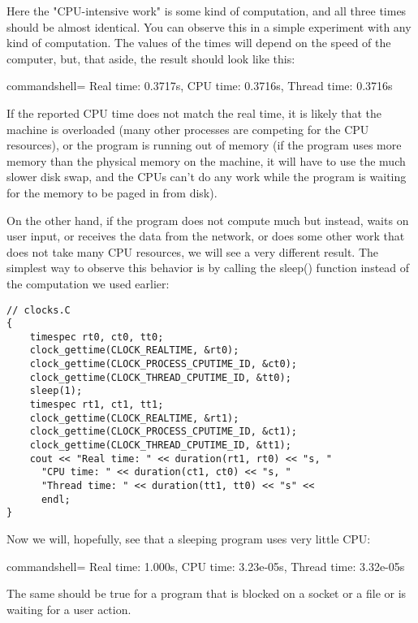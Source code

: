 Here the "CPU-intensive work" is some kind of computation, and all three times should be almost identical. You can observe this in a simple experiment with any kind of computation. The values of the times will depend on the speed of the computer, but, that aside, the result should look like this:

\begin{tcblisting}{commandshell={}}
Real time: 0.3717s, CPU time: 0.3716s, Thread time: 0.3716s
\end{tcblisting}

If the reported CPU time does not match the real time, it is likely that the machine is overloaded (many other processes are competing for the CPU resources), or the program is running out of memory (if the program uses more memory than the physical memory on the machine, it will have to use the much slower disk swap, and the CPUs can't do any work while the program is waiting for the memory to be paged in from disk).

On the other hand, if the program does not compute much but instead, waits on user input, or receives the data from the network, or does some other work that does not take many CPU resources, we will see a very different result. The simplest way to observe this behavior is by calling the sleep() function instead of the computation we used earlier:

\begin{lstlisting}[style=styleCXX]
// clocks.C
{
	timespec rt0, ct0, tt0;
	clock_gettime(CLOCK_REALTIME, &rt0);
	clock_gettime(CLOCK_PROCESS_CPUTIME_ID, &ct0);
	clock_gettime(CLOCK_THREAD_CPUTIME_ID, &tt0);
	sleep(1);
	timespec rt1, ct1, tt1;
	clock_gettime(CLOCK_REALTIME, &rt1);
	clock_gettime(CLOCK_PROCESS_CPUTIME_ID, &ct1);
	clock_gettime(CLOCK_THREAD_CPUTIME_ID, &tt1);
	cout << "Real time: " << duration(rt1, rt0) << "s, "
	  "CPU time: " << duration(ct1, ct0) << "s, "
	  "Thread time: " << duration(tt1, tt0) << "s" <<
  	  endl;
}
\end{lstlisting}

Now we will, hopefully, see that a sleeping program uses very little CPU:

\begin{tcblisting}{commandshell={}}
Real time: 1.000s, CPU time: 3.23e-05s, Thread time: 3.32e-05s
\end{tcblisting}

The same should be true for a program that is blocked on a socket or a file or is waiting for a user action.

